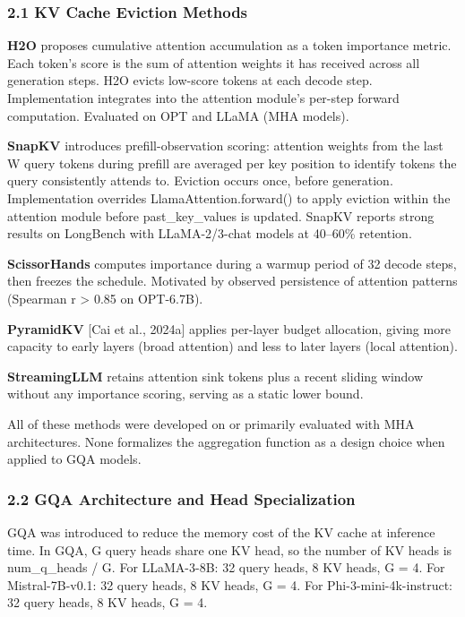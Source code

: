 
\subsubsection{2.1 KV Cache Eviction Methods}

\textbf{H2O} \citep{Zhang2023H2O} proposes cumulative attention accumulation as a token importance metric. Each token's score is the sum of attention weights it has received across all generation steps. H2O evicts low-score tokens at each decode step. Implementation integrates into the attention module's per-step forward computation. Evaluated on OPT and LLaMA (MHA models).

\textbf{SnapKV} \citep{Li2024SnapKV} introduces prefill-observation scoring: attention weights from the last W query tokens during prefill are averaged per key position to identify tokens the query consistently attends to. Eviction occurs once, before generation. Implementation overrides LlamaAttention.forward() to apply eviction within the attention module before past\_key\_values is updated. SnapKV reports strong results on LongBench with LLaMA-2/3-chat models at 40--60\% retention.

\textbf{ScissorHands} \citep{Liu2023ScissorHands} computes importance during a warmup period of 32 decode steps, then freezes the schedule. Motivated by observed persistence of attention patterns (Spearman r > 0.85 on OPT-6.7B).

\textbf{PyramidKV} [Cai et al., 2024a] applies per-layer budget allocation, giving more capacity to early layers (broad attention) and less to later layers (local attention).

\textbf{StreamingLLM} \citep{Xiao2023StreamingLLM} retains attention sink tokens plus a recent sliding window without any importance scoring, serving as a static lower bound.

All of these methods were developed on or primarily evaluated with MHA architectures. None formalizes the aggregation function as a design choice when applied to GQA models.

\subsubsection{2.2 GQA Architecture and Head Specialization}

GQA \citep{Ainslie2023GQA} was introduced to reduce the memory cost of the KV cache at inference time. In GQA, G query heads share one KV head, so the number of KV heads is num\_q\_heads / G. For LLaMA-3-8B: 32 query heads, 8 KV heads, G = 4. For Mistral-7B-v0.1: 32 query heads, 8 KV heads, G = 4. For Phi-3-mini-4k-instruct: 32 query heads, 8 KV heads, G = 4.

